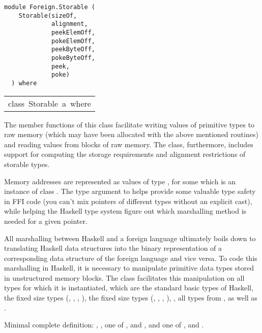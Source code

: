 \label{module:Foreign.Storable}
\haddockbeginheader
{\haddockverb\begin{verbatim}
module Foreign.Storable (
    Storable(sizeOf,
             alignment,
             peekElemOff,
             pokeElemOff,
             peekByteOff,
             pokeByteOff,
             peek,
             poke)
  ) where\end{verbatim}}
\haddockendheader

\begin{haddockdesc}
\item[\begin{tabular}{@{}l}
class\ Storable\ a\ where
\end{tabular}]\haddockbegindoc
The member functions of this class facilitate writing values of
primitive types to raw memory (which may have been allocated with the
above mentioned routines) and reading values from blocks of raw
memory.  The class, furthermore, includes support for computing the
storage requirements and alignment restrictions of storable types.
\par
Memory addresses are represented as values of type , for some
 which is an instance of class .  The type argument to
 helps provide some valuable type safety in FFI code (you can't
mix pointers of different types without an explicit cast), while
helping the Haskell type system figure out which marshalling method is
needed for a given pointer.
\par
All marshalling between Haskell and a foreign language ultimately
boils down to translating Haskell data structures into the binary
representation of a corresponding data structure of the foreign
language and vice versa.  To code this marshalling in Haskell, it is
necessary to manipulate primitive data types stored in unstructured
memory blocks.  The class  facilitates this manipulation on
all types for which it is instantiated, which are the standard basic
types of Haskell, the fixed size  types (, ,
, ), the fixed size  types (, ,
, ), , all types from ,
as well as .
\par
Minimal complete definition: , , one of ,
 and , and one of ,  and
.
\par


\end{haddockdesc}
